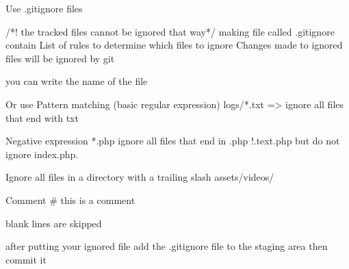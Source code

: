 Use .gitignore files 

/*! the tracked files cannot be ignored that way*/
making file called  .gitignore 
contain List of rules to determine which files to ignore 
Changes made to ignored files will be ignored by git 

you can write the name of the file 

Or use Pattern matching (basic regular expression)
  logs/*.txt   => ignore all files that end with txt

Negative expression 
  *.php      ignore all files that end in .php
  !.text.php  but do not ignore index.php.

Ignore all files in a directory with a trailing slash 
  assets/videos/ 

Comment 
  # this is a comment 

blank lines are skipped

after putting your ignored file 
  add the .gitignore file to the staging area 
  then commit it 
